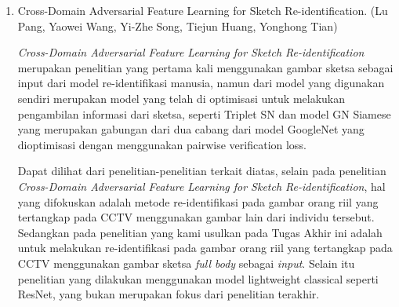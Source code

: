 \begin{enumerate}
    \item Cross-Domain Adversarial Feature Learning for Sketch
    Re-identification. (Lu Pang, Yaowei Wang, Yi-Zhe Song, Tiejun Huang, Yonghong Tian) \cite{cit:12}
    \par
    
    \textit{Cross-Domain Adversarial Feature Learning for Sketch Re-identification} merupakan penelitian yang pertama kali menggunakan gambar sketsa sebagai input dari model re-identifikasi manusia, namun dari model yang digunakan sendiri merupakan model yang telah di optimisasi untuk melakukan pengambilan informasi dari sketsa, seperti Triplet SN dan model GN Siamese yang merupakan gabungan dari dua cabang dari model GoogleNet yang dioptimisasi dengan menggunakan pairwise verification loss.
    \vspace{1ex}
    
    \par Dapat dilihat dari penelitian-penelitian terkait diatas, selain pada penelitian \textit{Cross-Domain Adversarial Feature Learning for Sketch Re-identification}, hal yang difokuskan adalah metode re-identifikasi pada gambar orang riil yang tertangkap pada CCTV menggunakan gambar lain dari individu tersebut. Sedangkan pada penelitian yang kami usulkan pada Tugas Akhir ini adalah untuk melakukan re-identifikasi pada gambar orang riil yang tertangkap pada CCTV menggunakan gambar sketsa \textit{full body}  sebagai \textit{input}.
    Selain itu penelitian yang dilakukan menggunakan model lightweight classical seperti ResNet, yang bukan merupakan fokus dari penelitian terakhir.

\end{enumerate}
\vspace{1ex}